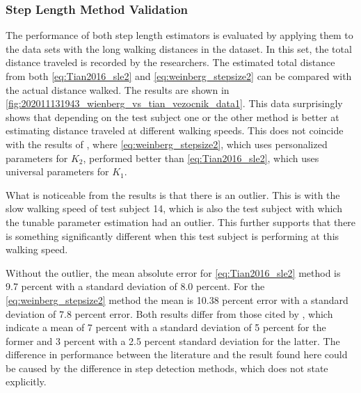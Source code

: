 \subsubsection{Step Length Method Validation}
\label{sec:results-step_length-validation}
The performance of both step length estimators is evaluated by applying them to the data sets with the long walking distances in the \citet{Vezocnik2019} dataset. In this set, the total distance traveled is recorded by the researchers. The estimated total distance from both \eqref{eq:Tian2016_sle2} and \eqref{eq:weinberg_stepsize2} can be compared with the actual distance walked. The results are shown in  \cref{fig:202011131943_wienberg_vs_tian_vezocnik_data1}. This data surprisingly shows that depending on the test subject one or the other method is better at estimating distance traveled at different walking speeds. This does not coincide with the results of \cite{Vezocnik2019}, where \eqref{eq:weinberg_stepsize2}, which uses personalized parameters for $ K_2 $, performed better than \eqref{eq:Tian2016_sle2}, which uses universal parameters for $ K_1 $. \par 

What is noticeable from the results is that there is an outlier. This is with the slow walking speed of test subject 14, which is also the test subject with which the tunable parameter estimation had an outlier. This further supports that there is something significantly different when this test subject is performing at this walking speed.\par 

 Without the outlier, the mean absolute error for \eqref{eq:Tian2016_sle2} method is 9.7 percent with a standard deviation of 8.0 percent. For the \eqref{eq:weinberg_stepsize2} method the mean is 10.38 percent error with a standard deviation of 7.8 percent error. Both results differ from those cited by \cite{Vezocnik2019}, which indicate a mean of 7 percent with a standard deviation of 5 percent for the former and 3 percent with a 2.5 percent standard deviation for the latter.
 The difference in performance between the literature and the result found here could be caused by the difference in step detection methods, which \cite{Vezocnik2019} does not state explicitly.

